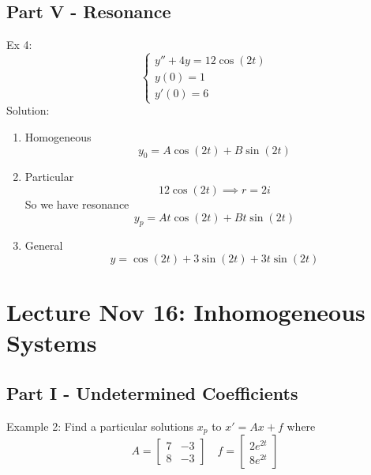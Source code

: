\documentclass[12pt]{article}
\begin{document}
\subsection*{Part V - Resonance} 
Ex 4:
\[\begin{cases}
    y'' + 4y = 12\cos(2t)\\
    y(0) = 1\\
    y'(0)= 6
\end{cases}\]
Solution:
\begin{enumerate}
    \item Homogeneous
    \[y_0 = A\cos(2t) + B\sin(2t)\]
    \item Particular 
    \[12\cos(2t) \implies r = 2i\]
    So we have resonance 
    \[y_p = At\cos(2t) + Bt\sin(2t)\]

    \item General 
    \[y = \cos(2t) + 3\sin(2t) + 3t\sin(2t)\]
\end{enumerate}

\section{Lecture Nov 16: Inhomogeneous Systems}
\subsection*{Part I - Undetermined Coefficients}
Example 2: Find a particular solutions $x_p$ to $x' = Ax + f$ where 
\[A = \begin{bmatrix}
    7 & -3\\
    8 & -3
\end{bmatrix} \quad f = \begin{bmatrix}
    2e^{2t}\\
    8e^{2t}
\end{bmatrix}\]
\end{document}
